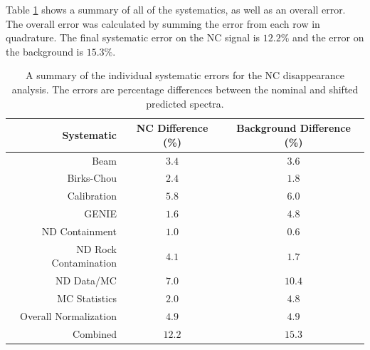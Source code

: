 Table \ref{tab:SystSummary} shows a summary of all of the systematics, as well as an overall error. The overall error was calculated by summing the error from each row in quadrature. The final systematic error on the NC signal is $12.2\%$ and the error on the background is $15.3\%$.
\begin{table}[htb]
  \begin{center}
    \caption[Systematic Error Summary]{A summary of the individual systematic errors for the NC disappearance analysis. The errors are percentage differences between the nominal and shifted predicted spectra.}
    \label{tab:SystSummary}
    \begin{tabular}{r c c}
      \hline\hline
      Systematic & NC Difference (\%) & Background Difference (\%) \\
      \hline
      Beam & $3.4$ & $3.6$ \\
      Birks-Chou & $2.4$ & $1.8$ \\
      Calibration & $5.8$ & $6.0$ \\
      GENIE & $1.6$ & $4.8$ \\
      ND Containment & $1.0$ & $0.6$ \\
      ND Rock Contamination & $4.1$ & $1.7$ \\
      ND Data/MC & $7.0$ & $10.4$ \\
      MC Statistics & $2.0$ & $4.8$ \\
      Overall Normalization & $4.9$ & $4.9$ \\
      \hline
      Combined & $12.2$ & $15.3$ \\
      \hline
    \end{tabular}
  \end{center}
\end{table}

